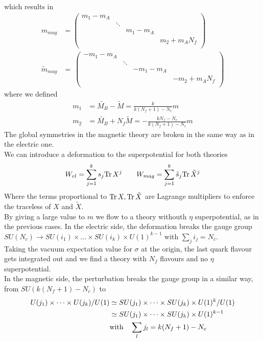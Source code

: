 which results in
\begin{align}
m_{mag} & = 
\begin{pmatrix}
 m_1 - m_A \\
& \ddots \\
&&  m_1 - m_A\\
&&& m_2 + m_A N_f\\
\end{pmatrix}
\\
\tilde{m}_{mag} & =\
\begin{pmatrix}
     - m_1 - m_A \\ & \ddots \\ &&  - m_1 - m_A \\ &&& -m_2 + m_A N_f\\   
      \end{pmatrix}
\end{align}
where we defined
\begin{align}
m_1 & = \tilde{M_B} - \tilde{M} = \frac{k}{k (N_f +1) - N_c} m\\
m_2 & = \tilde{M_B} + N_f \tilde{M} = - \frac{ k N_f - N_c}{k (N_f +1) - N_c} m
\end{align}
The global symmetries in the magnetic theory are broken in the same way as in the electric one.\\
We can introduce a deformation to the superpotential for both theories
\begin{equation}
 W_{el}= \sum_{j=1}^{k} s_j \mathrm{Tr } \,{ X^{j} } \qquad W_{mag} = \sum_{j=1}^{k}\tilde{s}_j \mathrm{Tr } \,{ \tilde{X}^{j}}
\end{equation}
Where the terms proportional to $ \mathrm{Tr } \,{X},\mathrm{Tr } \,{\tilde{X}}$ are Lagrange multipliers to enforce the traceless of $X$ and $\tilde{X}$.\\
By giving a large value to $m$ we flow to a theory withouth $\eta$ superpotential, as in the previous cases.
In the electric side, the deformation breaks the gauge group $SU(N_c) \rightarrow SU(i_1) \times \dots \times SU(i_k) \times U(1)^{k-1}$ with $\sum_j i_j = N_c$.\\
Taking the vacuum expectation value for $\sigma$ at the origin, the last quark flavour gets integrated out and we find a theory with $N_f$ flavours and no $\eta$ superpotential.
\\
In the magnetic side, the perturbation breaks the gauge group in a similar way, from $SU( k (N_f+1) - N_c)$ to
\begin{align} 
U(j_1) \times \dots \times U(j_k) / U(1) &  \simeq  SU(j_1) \times \dots \times SU(j_k) \times U(1)^{k}/U(1) \\  
 & \simeq  SU(j_1) \times \dots \times SU(j_k) \times U(1)^{k-1}\\
 & \hbox{with} \quad\sum_l j_l = k (N_f+1) - N_c  \;
\end{align} 

